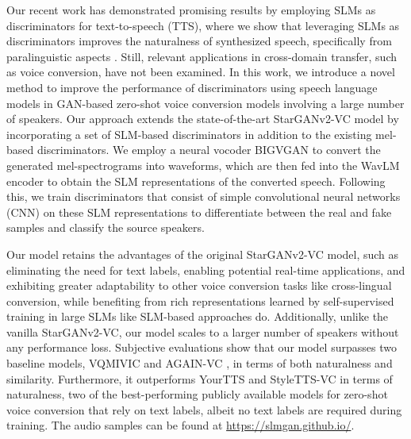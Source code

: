 \documentclass{article}
\begin{document}
\begin{sloppy}
Our recent work has demonstrated promising results by employing SLMs as discriminators for text-to-speech (TTS), where we show that leveraging SLMs as discriminators improves the naturalness of synthesized speech, specifically from paralinguistic aspects \cite{li2023styletts2}. Still, relevant applications in cross-domain transfer, such as voice conversion, have not been examined. In this work, we introduce a novel method to improve the performance of discriminators using speech language models in GAN-based zero-shot voice conversion models involving a large number of speakers. Our approach extends the state-of-the-art StarGANv2-VC \cite{li2021starganv2} model by incorporating a set of SLM-based discriminators in addition to the existing mel-based discriminators. We employ a neural vocoder BIGVGAN \cite{lee2022bigvgan} to convert the generated mel-spectrograms into waveforms, which are then fed into the WavLM \cite{chen2022wavlm} encoder to obtain the SLM representations of the converted speech. Following this, we train discriminators that consist of simple convolutional neural networks (CNN) on these SLM representations to differentiate between the real and fake samples and classify the source speakers. 

Our model retains the advantages of the original StarGANv2-VC model, such as eliminating the need for text labels, enabling potential real-time applications, and exhibiting greater adaptability to other voice conversion tasks like cross-lingual conversion, while benefiting from rich representations learned by self-supervised training in large SLMs like SLM-based approaches do. Additionally, unlike the vanilla StarGANv2-VC, our model scales to a larger number of speakers without any performance loss. Subjective evaluations show that our model surpasses two baseline models, VQMIVIC \cite{wang2021vqmivc} and AGAIN-VC \cite{chen2021again}, in terms of both naturalness and similarity. Furthermore, it outperforms YourTTS \cite{casanova2022yourtts} and StyleTTS-VC \cite{li2023styletts} in terms of naturalness, two of the best-performing publicly available models for zero-shot voice conversion that rely on text labels, albeit no text labels are required during training. The audio samples can be found at \url{https://slmgan.github.io/}.


\end{sloppy}
\end{document}
